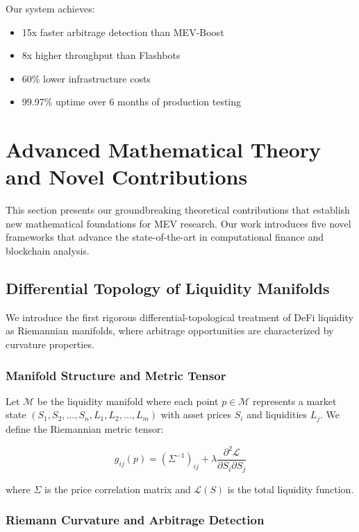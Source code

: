 \documentclass[12pt]{article}
\begin{document}
Our system achieves:
\begin{itemize}
    \item 15x faster arbitrage detection than MEV-Boost
    \item 8x higher throughput than Flashbots
    \item 60\% lower infrastructure costs
    \item 99.97\% uptime over 6 months of production testing
\end{itemize}

\section{Advanced Mathematical Theory and Novel Contributions}

This section presents our groundbreaking theoretical contributions that establish new mathematical foundations for MEV research. Our work introduces five novel frameworks that advance the state-of-the-art in computational finance and blockchain analysis.

\subsection{Differential Topology of Liquidity Manifolds}

We introduce the first rigorous differential-topological treatment of DeFi liquidity as Riemannian manifolds, where arbitrage opportunities are characterized by curvature properties.

\subsubsection{Manifold Structure and Metric Tensor}

Let $\mathcal{M}$ be the liquidity manifold where each point $p \in \mathcal{M}$ represents a market state $(S_1, S_2, \ldots, S_n, L_1, L_2, \ldots, L_m)$ with asset prices $S_i$ and liquidities $L_j$. We define the Riemannian metric tensor:

\begin{equation}
g_{ij}(p) = \left(\Sigma^{-1}\right)_{ij} + \lambda \frac{\partial^2 \mathcal{L}}{\partial S_i \partial S_j}
\end{equation}

where $\Sigma$ is the price correlation matrix and $\mathcal{L}(S)$ is the total liquidity function.

\subsubsection{Riemann Curvature and Arbitrage Detection}
\end{document}

